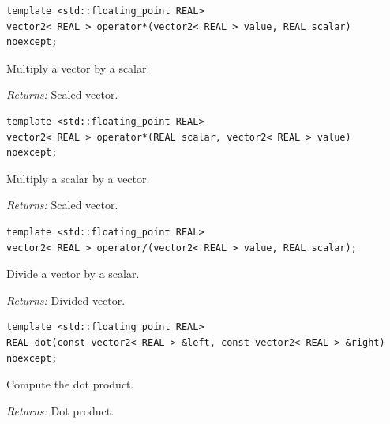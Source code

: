 \par\noindent\begin{minipage}{\linewidth}
\begin{lstlisting}[style=apireference]
template <std::floating_point REAL>
vector2< REAL > operator*(vector2< REAL > value, REAL scalar) noexcept;
\end{lstlisting}
{\footnotesize Multiply a vector by a scalar.\par}
{\footnotesize\textit{Returns:} Scaled vector.\par}
\end{minipage}\par\vspace{1pt}
\par\noindent\begin{minipage}{\linewidth}
\begin{lstlisting}[style=apireference]
template <std::floating_point REAL>
vector2< REAL > operator*(REAL scalar, vector2< REAL > value) noexcept;
\end{lstlisting}
{\footnotesize Multiply a scalar by a vector.\par}
{\footnotesize\textit{Returns:} Scaled vector.\par}
\end{minipage}\par\vspace{1pt}
\par\noindent\begin{minipage}{\linewidth}
\begin{lstlisting}[style=apireference]
template <std::floating_point REAL>
vector2< REAL > operator/(vector2< REAL > value, REAL scalar);
\end{lstlisting}
{\footnotesize Divide a vector by a scalar.\par}
{\footnotesize\textit{Returns:} Divided vector.\par}
\end{minipage}\par\vspace{1pt}
\par\noindent\begin{minipage}{\linewidth}
\begin{lstlisting}[style=apireference]
template <std::floating_point REAL>
REAL dot(const vector2< REAL > &left, const vector2< REAL > &right) noexcept;
\end{lstlisting}
{\footnotesize Compute the dot product.\par}
{\footnotesize\textit{Returns:} Dot product.\par}
\end{minipage}\par\vspace{1pt}
